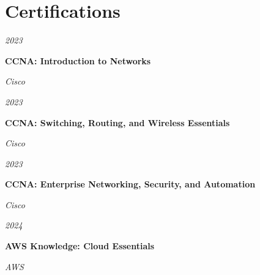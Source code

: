 \documentclass[../main.tex]{subfiles}
\begin{document}
     \section{Certifications}

        \begin{twocolentry}{
            \small
        \textit{2023}}

            \textbf{CCNA: Introduction to Networks}

            \textit{Cisco}

        \end{twocolentry}
        \vspace{0.10 cm}
    
        \begin{twocolentry}{
            \small
        \textit{2023}}

            \textbf{CCNA: Switching, Routing, and Wireless Essentials}
            
            \textit{Cisco}

        \end{twocolentry}
 
    
        \vspace{0.10 cm}
    
        \begin{twocolentry}{
            \small
        \textit{2023}}

            \textbf{CCNA: Enterprise Networking, Security, and Automation}

            \textit{Cisco}

        \end{twocolentry}
        \vspace{0.10 cm}
    
        \begin{twocolentry}{
            \small
        \textit{2024}}

            \textbf{AWS Knowledge: Cloud Essentials}

            \textit{AWS}

        \end{twocolentry}
 
\end{document}

